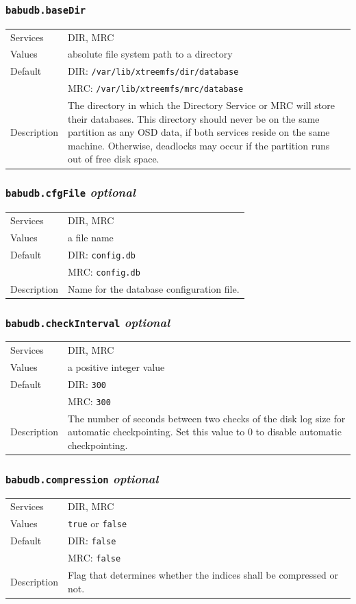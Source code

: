 \documentclass[a4paper,10pt]{book}
\begin{document}
\subsubsection{\texttt{babudb.baseDir}}
\begin{tabular}{lp{10cm}}
 Services & DIR, MRC\\
 Values   & absolute file system path to a directory\\
 Default  & DIR: \texttt{/var/lib/xtreemfs/dir/database}\\
          & MRC: \texttt{/var/lib/xtreemfs/mrc/database}\\
 Description & The directory in which the Directory Service or MRC will store their databases. This directory should never be on the same partition as any OSD data, if both services reside on the same machine. Otherwise, deadlocks may occur if the partition runs out of free disk space.
\end{tabular}

\subsubsection{\texttt{babudb.cfgFile} \textit{optional}}
\begin{tabular}{lp{10cm}}
 Services & DIR, MRC\\
 Values   & a file name\\
 Default  & DIR: \texttt{config.db}\\
          & MRC: \texttt{config.db}\\
 Description & Name for the database configuration file.
\end{tabular}

\subsubsection{\texttt{babudb.checkInterval} \textit{optional}}
\begin{tabular}{lp{10cm}}
 Services & DIR, MRC\\
 Values   & a positive integer value\\
 Default  & DIR: \texttt{300}\\
          & MRC: \texttt{300}\\
 Description & The number of seconds between two checks of the disk log size for automatic checkpointing. Set this value to 0 to disable automatic checkpointing. 
\end{tabular}

\subsubsection{\texttt{babudb.compression} \textit{optional}}
\begin{tabular}{lp{10cm}}
 Services & DIR, MRC\\
 Values   & \texttt{true} or \texttt{false}\\
 Default  & DIR: \texttt{false}\\
          & MRC: \texttt{false}\\
 Description & Flag that determines whether the indices shall be compressed or not.
\end{tabular}
\end{document}
